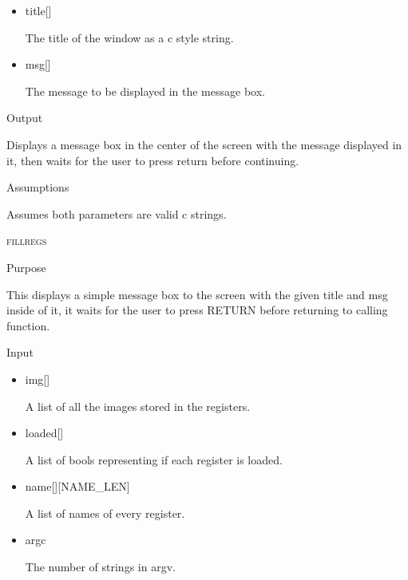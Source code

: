 \documentclass[pdftex, 11pt]{article}
\begin{document}
\begin{description}
\begin{description}
				\begin{itemize}
					
					\item{title[]}

						The title of the window as a c style string.

					\item{msg[]}

						The message to be displayed in the message box.

				\end{itemize}


			\item{Output}
				
				Displays a message box in the center of the screen with
				the message displayed in it, then waits for the user to press
				return before continuing.

			\item{Assumptions}

				Assumes both parameters are valid c strings.

		\end{description}



	\item{\textsc{fillregs}}
		\begin{description}
			\item{Purpose}

				This displays a simple message box to the screen with the given title and msg
				inside of it, it waits for the user to press RETURN before returning to
				calling function.

			\item{Input}

				\begin{itemize}

					\item{img[]}

						A list of all the images stored in the registers.

					\item{loaded[]}

						A list of bools representing if each register is loaded.

					\item{name[][NAME\_LEN]}

						A list of names of every register.
					
					\item{argc}

						The number of strings in argv.


\end{itemize}
\end{description}
\end{description}
\end{document}
